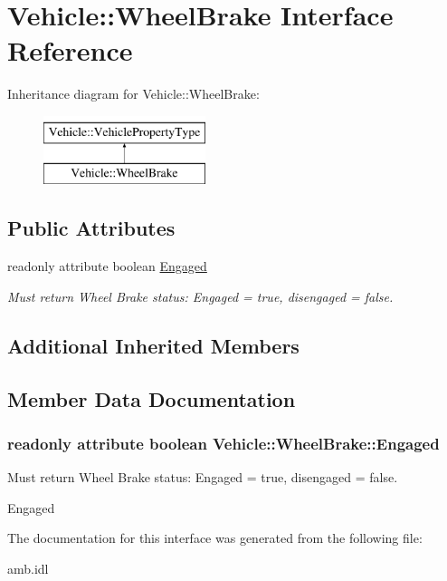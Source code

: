 \hypertarget{interfaceVehicle_1_1WheelBrake}{\section{Vehicle\-:\-:Wheel\-Brake Interface Reference}
\label{interfaceVehicle_1_1WheelBrake}
}
Inheritance diagram for Vehicle\-:\-:Wheel\-Brake\-:\begin{figure}[H]
\begin{center}
\leavevmode
\includegraphics[height=2.000000cm]{interfaceVehicle_1_1WheelBrake}
\end{center}
\end{figure}
\subsection*{Public Attributes}
\begin{DoxyCompactItemize}
\item 
readonly attribute boolean \hyperlink{interfaceVehicle_1_1WheelBrake_a673e712ad794547867b09d7e86da11f6}{Engaged}
\begin{DoxyCompactList}\small\item\em Must return Wheel Brake status\-: Engaged = true, disengaged = false. \end{DoxyCompactList}\end{DoxyCompactItemize}
\subsection*{Additional Inherited Members}


\subsection{Member Data Documentation}
\hypertarget{interfaceVehicle_1_1WheelBrake_a673e712ad794547867b09d7e86da11f6}{
\subsubsection[{Engaged}]{\setlength{\rightskip}{0pt plus 5cm}readonly attribute boolean Vehicle\-::\-Wheel\-Brake\-::\-Engaged}}\label{interfaceVehicle_1_1WheelBrake_a673e712ad794547867b09d7e86da11f6}


Must return Wheel Brake status\-: Engaged = true, disengaged = false. 

Engaged 

The documentation for this interface was generated from the following file\-:\begin{DoxyCompactItemize}
\item 
amb.\-idl\end{DoxyCompactItemize}
